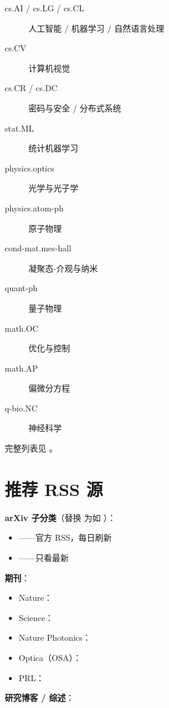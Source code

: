 \begin{description}
  \item[cs.AI / cs.LG / cs.CL] 人工智能 / 机器学习 / 自然语言处理
  \item[cs.CV] 计算机视觉
  \item[cs.CR / cs.DC] 密码与安全 / 分布式系统
  \item[stat.ML] 统计机器学习
  \item[physics.optics] 光学与光子学
  \item[physics.atom-ph] 原子物理
  \item[cond-mat.mes-hall] 凝聚态-介观与纳米
  \item[quant-ph] 量子物理
  \item[math.OC] 优化与控制
  \item[math.AP] 偏微分方程
  \item[q-bio.NC] 神经科学
\end{description}

完整列表见 。

\chapter{推荐 RSS 源}
\label{appx:rss}

\textbf{arXiv 子分类}（替换  为如 ）：

\begin{itemize}
  \item {}——官方 RSS，每日刷新
  \item {}——只看最新
\end{itemize}

\textbf{期刊}：

\begin{itemize}
  \item Nature：
  \item Science：
  \item Nature Photonics：
  \item Optica（OSA）：
  \item PRL：
\end{itemize}

\textbf{研究博客 / 综述}：


